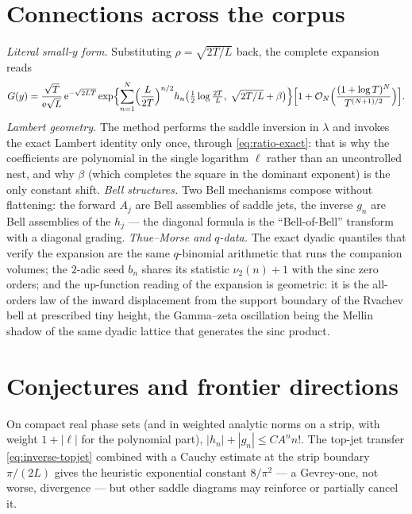 \documentclass[11pt,oneside]{article}
\numberwithin{equation}{section}
\theoremstyle{definition}
\theoremstyle{remark}
\newcommand{\e}{\mathrm e}
\newcommand{\bigO}{\mathcal O}
\newcommand{\vtwo}{\nu_2}
\newcommand{\abs}[1]{\left\lvert #1\right\rvert}
\begin{document}
\section{Connections across the corpus}
\label{sec:connections-inv}

\emph{Literal small-$y$ form.}  Substituting
$\rho=\sqrt{2T/L}$ back, the complete expansion reads
\begin{equation}
 G(y)=\frac{\sqrt T}{\e\sqrt L}\,\e^{-\sqrt{2LT}}
 \exp\Bigl\{\sum_{n=1}^{N}
 \Bigl(\frac{L}{2T}\Bigr)^{n/2}
 h_n\bigl(\tfrac12\log\tfrac{2T}L,\;
 \sqrt{2T/L}+\beta\bigr)\Bigr\}
 \Bigl[1+\bigO_N\Bigl(\frac{(1+\log T)^{N}}{T^{(N+1)/2}}\Bigr)\Bigr].
 \label{eq:literal}
\end{equation}
\emph{Lambert geometry.}  The method performs the saddle inversion in
$\lambda$ and invokes the exact Lambert identity only once, through
\eqref{eq:ratio-exact}: that is why the coefficients are polynomial
in the single logarithm $\ell$ rather than an uncontrolled nest, and
why $\beta$ (which completes the square in the dominant exponent) is
the only constant shift.  \emph{Bell structures.}  Two Bell
mechanisms compose without flattening: the forward
$A_j$ are Bell assemblies of saddle jets, the inverse $g_n$ are Bell
assemblies of the $h_j$ --- the diagonal formula is the
``Bell-of-Bell'' transform with a diagonal grading.
\emph{Thue--Morse and $q$-data.}  The exact dyadic quantiles that
verify the expansion are the same $q$-binomial arithmetic that runs
the companion volumes; the $2$-adic seed
$b_n$ shares its statistic $\vtwo(n)+1$ with the sinc zero orders;
and the up-function reading of the expansion is geometric: it is the
all-orders law of the inward displacement from the support boundary
of the Rvachev bell at prescribed tiny height, the Gamma--zeta
oscillation being the Mellin shadow of the same dyadic lattice that
generates the sinc product.

\section{Conjectures and frontier directions}
\label{sec:conjectures-inv}

\begin{conjecture}
\label{conj:gevrey}
On compact real phase sets (and in weighted analytic norms on a
strip, with weight $1+\abs\ell$ for the polynomial part),
$\abs{h_n}+\abs{g_n}\le CA^{n}n!$.  The top-jet transfer
\eqref{eq:inverse-topjet} combined with a Cauchy estimate at the
strip boundary $\pi/(2L)$ gives the heuristic exponential constant
$8/\pi^{2}$ --- a Gevrey-one, not worse, divergence --- but other
saddle diagrams may reinforce or partially cancel it.
\end{conjecture}
\end{document}
